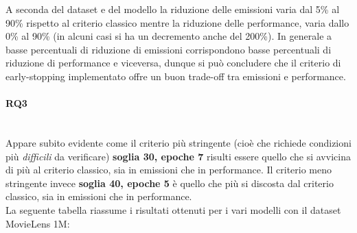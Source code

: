 \noindent A seconda del dataset e del modello la riduzione delle emissioni varia dal 5\% al 90\% rispetto al criterio classico mentre la riduzione delle performance, varia dallo 0\% al 90\% (in alcuni casi si ha un decremento anche del 200\%). In generale a basse percentuali di riduzione di emissioni corrispondono basse percentuali di riduzione di performance e viceversa, dunque si può concludere che il criterio di early-stopping implementato offre un buon trade-off tra emissioni e performance.\\


\paragraph*{RQ3} \textcolor{white}{.}\\
Appare subito evidente come il criterio più stringente (cioè che richiede condizioni più \textit{difficili} da verificare) \textbf{soglia 30, epoche 7} risulti essere quello che si avvicina di più al criterio classico, sia in emissioni che in performance. Il criterio meno stringente invece \textbf{soglia 40, epoche 5} è quello che più si discosta dal criterio classico, sia in emissioni che in performance.\\
La seguente tabella riassume i risultati ottenuti per i vari modelli con il dataset MovieLens 1M:
\begin{table}[H]
    \centering
    \caption{Riassunto dei risultati per il dataset MovieLens 1M}
\end{table}

